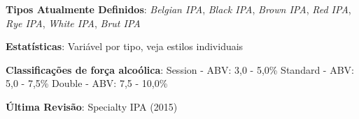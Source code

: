 \textbf{Tipos Atualmente Definidos}: \textit{Belgian IPA}, \textit{Black IPA}, \textit{Brown IPA}, \textit{Red IPA}, \textit{Rye IPA}, \textit{White IPA}, \textit{Brut IPA}

\textbf{Estatísticas}: Variável por tipo, veja estilos individuais

\textbf{Classificações de força alcoólica}: Session - ABV: 3,0 - 5,0\% Standard - ABV: 5,0 - 7,5\% Double - ABV: 7,5 - 10,0\%

\textbf{Última Revisão}: Specialty IPA (2015)